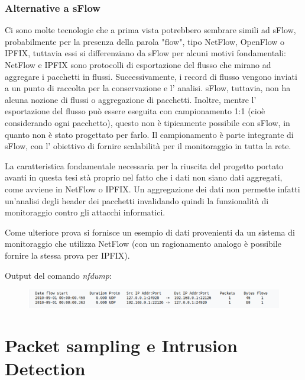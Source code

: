 \documentclass[12pt,a4paper,openright,twoside]{report}
\begin{document}
\subsubsection{Alternative a sFlow}

Ci sono molte tecnologie che a prima vista potrebbero sembrare simili ad sFlow,
probabilmente per la presenza della parola "flow", tipo NetFlow, OpenFlow o IPFIX,
tuttavia essi si differenziano da sFlow per alcuni motivi fondamentali:
NetFlow e IPFIX sono protocolli di esportazione del flusso che mirano ad aggregare i pacchetti in flussi.
Successivamente, i record di flusso vengono inviati a un punto di raccolta per la
conservazione e l' analisi. \cite{S1} sFlow, tuttavia, non ha alcuna nozione di flussi o
aggregazione di pacchetti.
Inoltre, mentre l' esportazione del flusso pu\`o essere eseguita con campionamento 1:1
(cio\`e considerando ogni pacchetto), questo non \`e tipicamente possibile con sFlow,
in quanto non \`e stato progettato per farlo. Il campionamento \`e parte integrante di
sFlow, con l' obiettivo di fornire scalabilit\`a per il monitoraggio in tutta la rete. \cite{S2}

La caratteristica fondamentale necessaria per la riuscita del progetto portato avanti in questa tesi
st\`a proprio nel fatto che i dati non siano dati aggregati, come avviene
in NetFlow o IPFIX. Un aggregazione dei dati non permette infatti un'analisi degli header
dei pacchetti invalidando quindi la funzionalit\`a di monitoraggio contro gli
attacchi informatici.

Come ulteriore prova si fornisce un esempio di dati provenienti da un sistema
di monitoraggio che utilizza NetFlow (con un ragionamento analogo \`e possibile
fornire la stessa prova per IPFIX).

Output del comando {\it nfdump}:
\begin{figure}[h!]
  \begin{center}                          %
    \includegraphics[width=\linewidth]{images/netflow.png}
    \caption{}
    \label{}
  \end{center}
\end{figure}

\newpage

\section{Packet sampling e Intrusion Detection}
\end{document}
